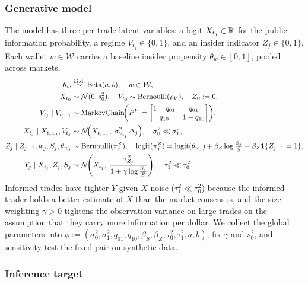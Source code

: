 \subsubsection{Generative model}

The model has three per-trade latent variables: a logit $X_{t_j} \in \mathbb{R}$ for the public-information probability, a regime $V_{t_j} \in \{0,1\}$, and an insider indicator $Z_j \in \{0,1\}$. Each wallet $w \in \mathcal{W}$ carries a baseline insider propensity $\theta_w \in [0,1]$, pooled across markets.
\begin{align}
\theta_w &\stackrel{\text{i.i.d.}}{\sim} \mathrm{Beta}(a,b), \quad w \in \mathcal{W}, \label{eq:wallet}\\
X_{t_0} &\sim \Nc(0, s_0^2), \quad V_{t_0} \sim \mathrm{Bernoulli}(\rho_V), \quad Z_0 := 0, \label{eq:init}\\
V_{t_j} \mid V_{t_{j-1}} &\sim \mathrm{MarkovChain}\!\left( P^V = \begin{bmatrix} 1-q_{01} & q_{01} \\ q_{10} & 1-q_{10}\end{bmatrix}\right), \label{eq:V}\\
X_{t_j} \mid X_{t_{j-1}}, V_{t_j} &\sim \Nc\!\left( X_{t_{j-1}},\; \sigma^2_{V_{t_j}}\,\Delta_j \right), \quad \sigma^2_0 \ll \sigma^2_1, \label{eq:X}\\
Z_j \mid Z_{j-1}, w_j, S_j, \theta_{w_j} &\sim \mathrm{Bernoulli}(\pi^Z_j), \quad \mathrm{logit}(\pi^Z_j) = \mathrm{logit}(\theta_{w_j}) + \beta_S \log\tfrac{S_j}{\bar S} + \beta_Z \mathbf{1}\{Z_{j-1}=1\}, \label{eq:Z}\\
Y_j \mid X_{t_j}, Z_j, S_j &\sim \Nc\!\left( X_{t_j},\; \frac{\tau^2_{Z_j}}{1 + \gamma \log\tfrac{S_j}{\bar S}} \right), \quad \tau^2_1 \ll \tau^2_0. \label{eq:Y}
\end{align}
Informed trades have tighter $Y$-given-$X$ noise ($\tau^2_1 \ll \tau^2_0$) because the informed trader holds a better estimate of $X$ than the market consensus, and the size weighting $\gamma > 0$ tightens the observation variance on large trades on the assumption that they carry more information per dollar. We collect the global parameters into $\phi := (\sigma^2_0, \sigma^2_1, q_{01}, q_{10}, \beta_S, \beta_Z, \tau^2_0, \tau^2_1, a, b)$, fix $\gamma$ and $s_0^2$, and sensitivity-test the fixed pair on synthetic data.

\subsubsection{Inference target}


